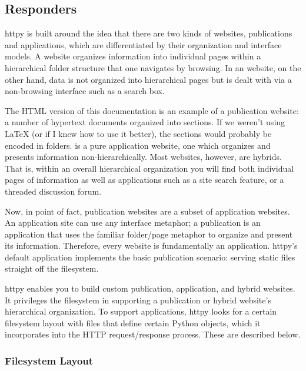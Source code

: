 \subsection{ Responders \label{multiple}}

httpy is built around the idea that there are two kinds of websites,
publications and applications, which are differentiated by their organization
and interface models. A  website organizes information into
individual pages within a hierarchical folder structure that one navigates by
browsing. In an  website, on the other hand, data is not
organized into hierarchical pages but is dealt with via a non-browsing interface
such as a search box.

The HTML version of this documentation is an example of a publication website: a
number of hypertext documents organized into sections. If we weren't using LaTeX
(or if I knew how to use it better), the sections would probably be encoded in
folders.  is a pure application
website, one which organizes and presents information non-hierarchically. Most
websites, however, are hybrids. That is, within an overall hierarchical
organization you will find both individual pages of information as well as
applications such as a site search feature, or a threaded discussion forum.

Now, in point of fact, publication websites are a subset of application
websites. An application site can use any interface metaphor; a publication is
an application that uses the familiar folder/page metaphor to organize and
present its information. Therefore, every website is fundamentally an
application. httpy's default application implements the basic publication
scenario: serving static files straight off the filesystem.

httpy enables you to build custom publication, application, and hybrid websites.
It privileges the filesystem in supporting a publication or hybrid website's
hierarchical organization. To support applications, httpy looks for a certain
filesystem layout with files that define certain Python objects, which it
incorporates into the HTTP request/response process. These are described below.



\subsubsection{Filesystem Layout}


